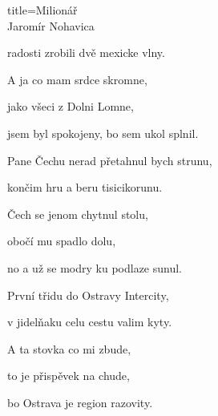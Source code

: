 \begin{song}{title=\centering Milionář \\\normalsize Jaromír Nohavica  \vspace*{-0.3cm}}
\begin{centerjustified}
\begin{varwidth}[t]{0.5\textwidth}
radosti zrobili dvě mexicke vlny. 

A ja co mam srdce skromne, 

jako všeci z Dolni Lomne, 

jsem byl spokojeny, bo sem ukol splnil. 

\sloka
Pane Čechu nerad přetahnul bych strunu, 

končim hru a beru tisicikorunu. 

Čech se jenom chytnul stolu, 

obočí mu spadlo dolu, 

no a už se modry ku podlaze sunul. 

\sloka
První třidu do Ostravy Intercity, 

v jidelňaku celu cestu valim kyty.

A ta stovka co mi zbude, 

to je přispěvek na chude, 

bo Ostrava je region razovity.


\end{varwidth}
\end{centerjustified}
\setcounter{Slokočet}{0}
\end{song}
